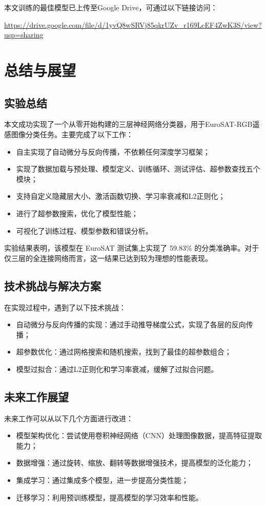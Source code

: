 \documentclass[UTF8]{article}
\begin{document}
本文训练的最佳模型已上传至Google Drive，可通过以下链接访问：
\begin{center}
\url{https://drive.google.com/file/d/1yvQ8wSRVj85qkrUZv_r169LcEF4ZwK3S/view?usp=sharing}
\end{center}
\section{总结与展望}
\subsection{实验总结}
本文成功实现了一个从零开始构建的三层神经网络分类器，用于EuroSAT-RGB遥感图像分类任务。主要完成了以下工作：
\begin{itemize}[topsep=0pt, partopsep=0pt, itemsep=0pt, parsep=0pt]
    \item 自主实现了自动微分与反向传播，不依赖任何深度学习框架；
    \item 实现了数据加载与预处理、模型定义、训练循环、测试评估、超参数查找五个模块；
    \item 支持自定义隐藏层大小、激活函数切换、学习率衰减和L2正则化；
    \item 进行了超参数搜索，优化了模型性能；
    \item 可视化了训练过程、模型参数和错误分析。
\end{itemize}
实验结果表明，该模型在 EuroSAT 测试集上实现了 59.83\% 的分类准确率。对于仅三层的全连接网络而言，这一结果已达到较为理想的性能表现。
\subsection{技术挑战与解决方案}
在实现过程中，遇到了以下技术挑战：
\begin{itemize}[topsep=0pt, partopsep=0pt, itemsep=0pt, parsep=0pt]
    \item 自动微分与反向传播的实现：通过手动推导梯度公式，实现了各层的反向传播；
    \item 超参数优化：通过网格搜索和随机搜索，找到了最佳的超参数组合；
    \item 模型过拟合：通过L2正则化和学习率衰减，缓解了过拟合问题。
\end{itemize}
\subsection{未来工作展望}
未来工作可以从以下几个方面进行改进：
\begin{itemize}[topsep=0pt, partopsep=0pt, itemsep=0pt, parsep=0pt]
    \item 模型架构优化：尝试使用卷积神经网络（CNN）处理图像数据，提高特征提取能力；
    \item 数据增强：通过旋转、缩放、翻转等数据增强技术，提高模型的泛化能力；
    \item 集成学习：通过集成多个模型，进一步提高分类性能；
    \item 迁移学习：利用预训练模型，提高模型的学习效率和性能。
\end{itemize}



\end{document}

